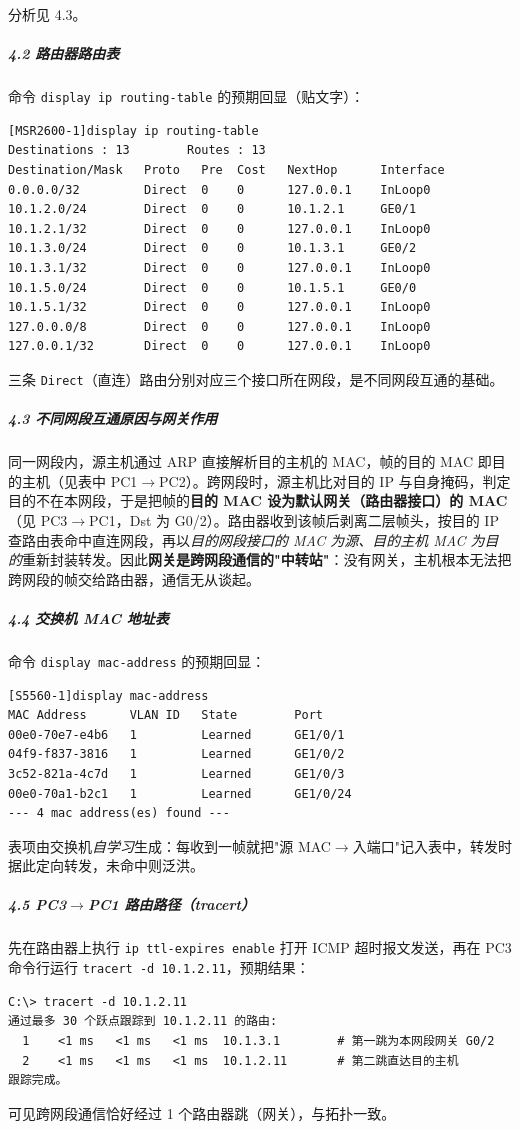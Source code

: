 \documentclass[12pt,a4paper]{article}
\begin{document}
\noindent 分析见 4.3。

\subparagraph{4.2 路由器路由表}
命令 \lstinline|display ip routing-table| 的预期回显（贴文字）：
\begin{lstlisting}[style=cli]
[MSR2600-1]display ip routing-table
Destinations : 13        Routes : 13
Destination/Mask   Proto   Pre  Cost   NextHop      Interface
0.0.0.0/32         Direct  0    0      127.0.0.1    InLoop0
10.1.2.0/24        Direct  0    0      10.1.2.1     GE0/1
10.1.2.1/32        Direct  0    0      127.0.0.1    InLoop0
10.1.3.0/24        Direct  0    0      10.1.3.1     GE0/2
10.1.3.1/32        Direct  0    0      127.0.0.1    InLoop0
10.1.5.0/24        Direct  0    0      10.1.5.1     GE0/0
10.1.5.1/32        Direct  0    0      127.0.0.1    InLoop0
127.0.0.0/8        Direct  0    0      127.0.0.1    InLoop0
127.0.0.1/32       Direct  0    0      127.0.0.1    InLoop0
\end{lstlisting}
三条 \texttt{Direct}（直连）路由分别对应三个接口所在网段，是不同网段互通的基础。

\subparagraph{4.3 不同网段互通原因与网关作用}
同一网段内，源主机通过 ARP 直接解析目的主机的 MAC，帧的目的 MAC 即目的主机（见表中 PC1$\to$PC2）。跨网段时，源主机比对目的 IP 与自身掩码，判定目的不在本网段，于是把帧的\textbf{目的 MAC 设为默认网关（路由器接口）的 MAC}（见 PC3$\to$PC1，Dst 为 G0/2）。路由器收到该帧后剥离二层帧头，按目的 IP 查路由表命中直连网段，再以\emph{目的网段接口的 MAC 为源、目的主机 MAC 为目的}重新封装转发。因此\textbf{网关是跨网段通信的"中转站"}：没有网关，主机根本无法把跨网段的帧交给路由器，通信无从谈起。

\subparagraph{4.4 交换机 MAC 地址表}
命令 \lstinline|display mac-address| 的预期回显：
\begin{lstlisting}[style=cli]
[S5560-1]display mac-address
MAC Address      VLAN ID   State        Port
00e0-70e7-e4b6   1         Learned      GE1/0/1
04f9-f837-3816   1         Learned      GE1/0/2
3c52-821a-4c7d   1         Learned      GE1/0/3
00e0-70a1-b2c1   1         Learned      GE1/0/24
--- 4 mac address(es) found ---
\end{lstlisting}
表项由交换机\emph{自学习}生成：每收到一帧就把"源 MAC$\to$入端口"记入表中，转发时据此定向转发，未命中则泛洪。

\subparagraph{4.5 PC3$\to$PC1 路由路径（tracert）}
先在路由器上执行 \lstinline|ip ttl-expires enable| 打开 ICMP 超时报文发送，再在 PC3 命令行运行 \lstinline|tracert -d 10.1.2.11|，预期结果：
\begin{lstlisting}[style=cli]
C:\> tracert -d 10.1.2.11
通过最多 30 个跃点跟踪到 10.1.2.11 的路由:
  1    <1 ms   <1 ms   <1 ms  10.1.3.1        # 第一跳为本网段网关 G0/2
  2    <1 ms   <1 ms   <1 ms  10.1.2.11       # 第二跳直达目的主机
跟踪完成。
\end{lstlisting}
可见跨网段通信恰好经过 1 个路由器跳（网关），与拓扑一致。
\end{document}
